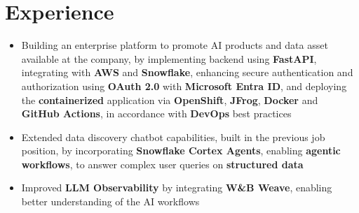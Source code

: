 \documentclass[12pt,letterpaper,sans]{moderncv}        %
\begin{document}
\section{Experience}

\begin{itemize}
    \item Building an enterprise platform to promote AI products and data asset available at the company, by implementing backend using \textbf{FastAPI}, integrating with \textbf{AWS} and \textbf{Snowflake}, enhancing secure authentication and authorization using \textbf{OAuth 2.0} with \textbf{Microsoft Entra ID}, and deploying the \textbf{containerized} application via \textbf{OpenShift}, \textbf{JFrog}, \textbf{Docker} and \textbf{GitHub Actions}, in accordance with \textbf{DevOps} best practices
  \
    \item Extended data discovery chatbot capabilities, built in the previous job position, by incorporating \textbf{Snowflake Cortex Agents}, enabling \textbf{agentic workflows}, to answer complex user queries on \textbf{structured data}
    \item Improved \textbf{LLM Observability} by integrating \textbf{W\&B Weave}, enabling better understanding of the AI workflows
\end{itemize}

\vspace{1.0em}
\end{document}
